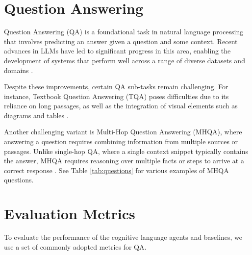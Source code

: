\section{Question Answering}

Question Answering (QA) is a foundational task in natural language processing that involves predicting an answer given a question and some context. Recent advances in LLMs have led to significant progress in this area, enabling the development of systems that perform well across a range of diverse datasets and domains \cite{10.1561/1500000102}.


\noindent Despite these improvements, certain QA sub-tasks remain challenging. For instance, Textbook Question Answering (TQA) poses difficulties due to its reliance on long passages, as well as the integration of visual elements such as diagrams and tables \cite{ALAWWAD2025111332}.

\noindent Another challenging variant is Multi-Hop Question Answering (MHQA), where answering a question requires combining information from multiple sources or passages. Unlike single-hop QA, where a single context snippet typically contains the answer, MHQA requires reasoning over multiple facts or steps to arrive at a correct response \cite{10.1561/1500000102}. See Table \ref{tab:questions} for various examples of MHQA questions.




\section{Evaluation Metrics}

To evaluate the performance of the cognitive language agents and baselines, we use a set of commonly adopted metrics for QA.

